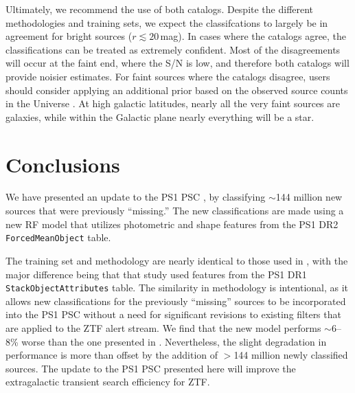 \documentclass[twocolumn]{aastex63}
\begin{document}
Ultimately, we recommend the use of both catalogs. Despite the different
methodologies and training sets, we expect the classifcations to largely be in
agreement for bright sources ($r \lesssim 20$\,mag). In cases where the
catalogs agree, the classifications can be treated as extremely confident.
Most of the disagreements will occur at the faint end, where the S/N is low,
and therefore both catalogs will provide noisier estimates. For faint sources
where the catalogs disagree, users should consider applying an additional
prior based on the observed source counts in the Universe
\citep[e.g.][]{Yasuda01}. At high galactic latitudes, nearly all the very
faint sources are galaxies, while within the Galactic plane nearly everything
will be a star.

\section{Conclusions}

We have presented an update to the PS1 PSC \citep{Tachibana18}, by classifying
$\sim$144 million new sources that were previously ``missing.'' The new
classifications are made using a new RF model that utilizes photometric and
shape features from the PS1 DR2 \texttt{ForcedMeanObject} table.

The training set and methodology are nearly identical to those used in
\citet{Tachibana18}, with the major difference being that that study used
features from the PS1 DR1 \texttt{StackObjectAttributes} table. The similarity
in methodology is intentional, as it allows new classifications for the
previously ``missing'' sources to be incorporated into the PS1 PSC without a
need for significant revisions to existing filters that are applied to the ZTF
alert stream. We find that the new model performs $\sim$6--8\% worse than the
one presented in \citet[][see Table~\ref{tbl:thresh}]{Tachibana18}.
Nevertheless, the slight degradation in performance is more than offset by the
addition of $>$144 million newly classified sources. The update to the PS1 PSC
presented here will improve the extragalactic transient search efficiency for
ZTF.

\acknowledgments

\vspace{5mm}

\end{document}
